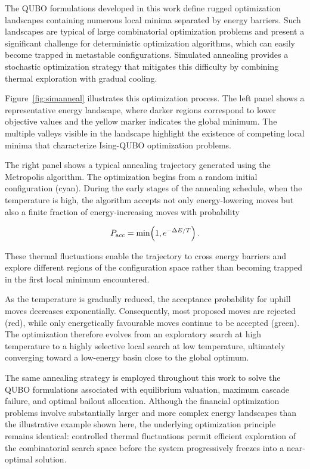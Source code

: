 \documentclass[aps,reprint,superscriptaddress,pra]{revtex4-2}
\begin{document}
The QUBO formulations developed in this work define rugged optimization landscapes containing numerous local minima separated by energy barriers. Such landscapes are typical of large combinatorial optimization problems and present a significant challenge for deterministic optimization algorithms, which can easily become trapped in metastable configurations. Simulated annealing provides a stochastic optimization strategy that mitigates this difficulty by combining thermal exploration with gradual cooling. \cite{kirkpatrick1983optimization}

Figure~\ref{fig:simanneal} illustrates this optimization process. The left panel shows a representative energy landscape, where darker regions correspond to lower objective values and the yellow marker indicates the global minimum. The multiple valleys visible in the landscape highlight the existence of competing local minima that characterize Ising-QUBO optimization problems.

The right panel shows a typical annealing trajectory generated using the Metropolis algorithm. The optimization begins from a random initial configuration (cyan). During the early stages of the annealing schedule, when the temperature is high, the algorithm accepts not only energy-lowering moves but also a finite fraction of energy-increasing moves with probability \cite{metropolis1953equation}

\begin{equation}
P_{\rm acc}
=
\min\!\left(1,e^{-\Delta E/T}\right).
\end{equation}


These thermal fluctuations enable the trajectory to cross energy barriers and explore different regions of the configuration space rather than becoming trapped in the first local minimum encountered.

As the temperature is gradually reduced, the acceptance probability for uphill moves decreases exponentially. Consequently, most proposed moves are rejected (red), while only energetically favourable moves continue to be accepted (green). The optimization therefore evolves from an exploratory search at high temperature to a highly selective local search at low temperature, ultimately converging toward a low-energy basin close to the global optimum.

The same annealing strategy is employed throughout this work to solve the QUBO formulations associated with equilibrium valuation, maximum cascade failure, and optimal bailout allocation. Although the financial optimization problems involve substantially larger and more complex energy landscapes than the illustrative example shown here, the underlying optimization principle remains identical: controlled thermal fluctuations permit efficient exploration of the combinatorial search space before the system progressively freezes into a near-optimal solution.
\end{document}
